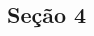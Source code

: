 \documentclass[a0,portrait]{a0poster}
\begin{document}
\begin{multicols}{2}
\section*{\huge Seção 4}
\color{Black}





%
%

\end{multicols}

\end{document}
